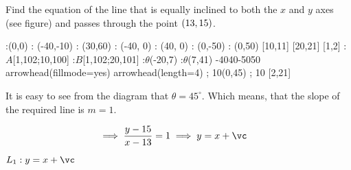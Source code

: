 



\SUBTRACT\vb\va\vc

\question[2] Find the equation of the line that is equally inclined to both the 
$x$ and $y$ axes (see figure) and passes through the point $(13, 15)$.

\watchout

  \def\xmin{-40}
  \def\xmax{40}
  \def\ymin{-50}
  \def\ymax{50}
  \def\rotangle{45}
  :(0,0)
  : (-40,-10)
  : (30,60)
  : (\xmin, 0)
  : (\xmax, 0)
  : (0,\ymin)
  : (0,\ymax)
   [10,11] %
   [20,21] %
   [1,2]
   :$A$[1,102;10,100]
   :$B$[1,102;20,101]
  :$\theta$(-20,7)
  :$\theta$(7,41)
\figdrawbegin{}
  \xmin\xmax\ymin\ymax
  \figdrawline [1,2]
  \figset arrowhead(fillmode=yes)
  \figdrawarrowhead [1,2]
  \figdrawarrowhead [2,1]
  \figset arrowhead(length=4) 
   ; 10(0,45)
   ; 10 [2,21]
\figdrawend
{}

\ifprintanswers
  \begin{marginfigure}
    \centerline{\box\figBoxA}
  \end{marginfigure}
\else
  \vspace{1cm}
  \centerline{\box\figBoxA}
\fi

\begin{solution}[\halfpage]
    It is easy to see from the diagram that $\theta=45^\circ$. Which means, that the slope of the 
    required line is $m=1$.

    \begin{align}
    	\implies \dfrac{y-\vb}{x-\va} &= 1 \implies y = x + \vc
    \end{align}
\end{solution}

\ifprintanswers
  \begin{codex}
    $L_1: y = x + \vc$
  \end{codex}
\fi
